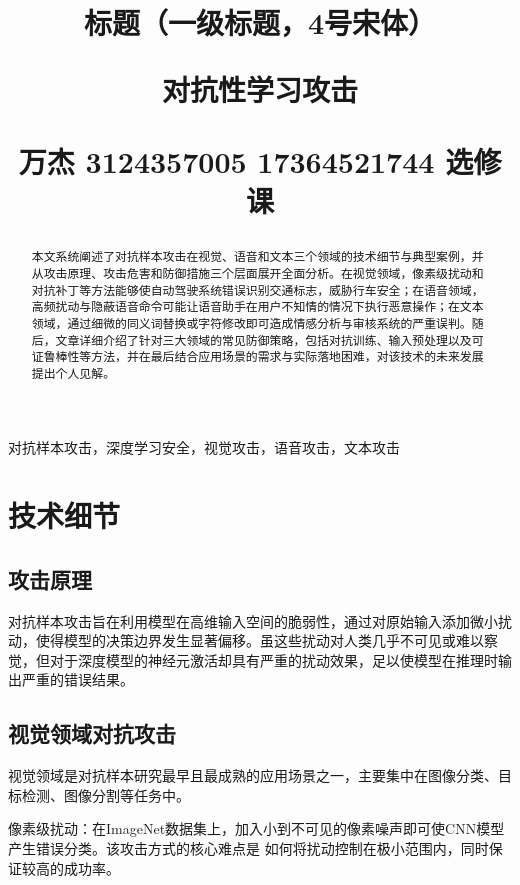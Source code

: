 \documentclass[main]{IEEEtran}
\title{\zihao{4}\songti 标题（一级标题，4号宋体）}
\begin{document}
\pagestyle{plain}  %


\title{
对抗性学习攻击

{\footnotesize \textsuperscript{} 万杰 3124357005 17364521744 选修课}
}
\maketitle
\thispagestyle{plain}
\pagestyle{plain}
\begin{abstract}
    \kaishu  %
本文系统阐述了对抗样本攻击在视觉、语音和文本三个领域的技术细节与典型案例，并从攻击原理、攻击危害和防御措施三个层面展开全面分析。在视觉领域，像素级扰动和对抗补丁等方法能够使自动驾驶系统错误识别交通标志，威胁行车安全；在语音领域，高频扰动与隐蔽语音命令可能让语音助手在用户不知情的情况下执行恶意操作；在文本领域，通过细微的同义词替换或字符修改即可造成情感分析与审核系统的严重误判。随后，文章详细介绍了针对三大领域的常见防御策略，包括对抗训练、输入预处理以及可证鲁棒性等方法，并在最后结合应用场景的需求与实际落地困难，对该技术的未来发展提出个人见解。
\end{abstract}

\begin{IEEEkeywords}
    \kaishu  %
 对抗样本攻击，深度学习安全，视觉攻击，语音攻击，文本攻击
\end{IEEEkeywords}


\section{技术细节}
\subsection{攻击原理}
对抗样本攻击旨在利用模型在高维输入空间的脆弱性，通过对原始输入添加微小扰动，使得模型的决策边界发生显著偏移。虽这些扰动对人类几乎不可见或难以察觉，但对于深度模型的神经元激活却具有严重的扰动效果，足以使模型在推理时输出严重的错误结果\cite{goodfellow2014explaining}。

\subsection{视觉领域对抗攻击}
视觉领域是对抗样本研究最早且最成熟的应用场景之一，主要集中在图像分类、目标检测、图像分割等任务中。

像素级扰动：在ImageNet数据集上，加入小到不可见的像素噪声即可使CNN模型产生错误分类\cite{goodfellow2014explaining}。该攻击方式的核心难点是 如何将扰动控制在极小范围内，同时保证较高的成功率。
\end{document}
